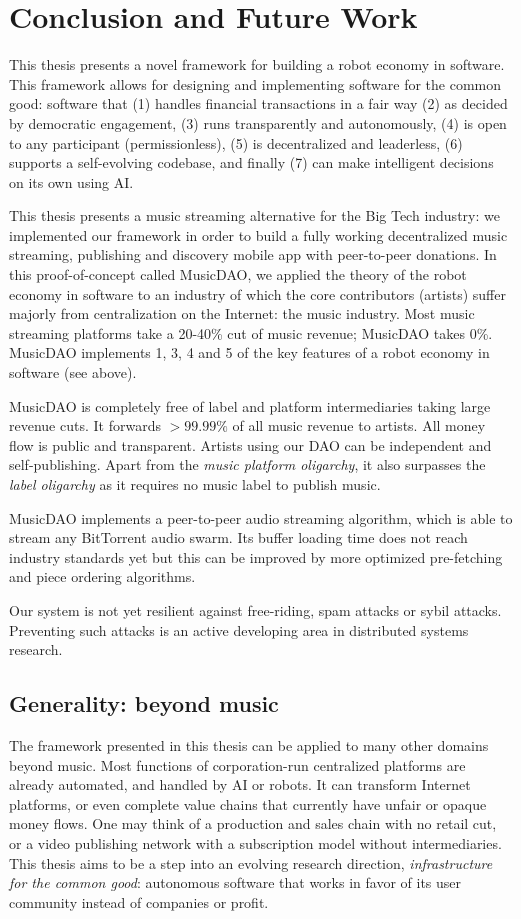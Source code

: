 \chapter{Conclusion and Future Work}
This thesis presents a novel framework for building a robot economy in software. This framework allows for designing and implementing software for the common good: software that (1) handles financial transactions in a fair way (2) as decided by democratic engagement, (3) runs transparently and autonomously, (4) is open to any participant (permissionless), (5) is decentralized and leaderless, (6) supports a self-evolving codebase, and finally (7) can make intelligent decisions on its own using AI.

This thesis presents a music streaming alternative for the Big Tech industry: we implemented our framework in order to build a fully working decentralized music streaming, publishing and discovery mobile app with peer-to-peer donations. In this proof-of-concept called MusicDAO, we applied the theory of the robot economy in software to an industry of which the core contributors (artists) suffer majorly from centralization on the Internet: the music industry. Most music streaming platforms take a 20-40\% cut of music revenue; MusicDAO takes 0\%. MusicDAO implements 1, 3, 4 and 5 of the key features of a robot economy in software (see above).

MusicDAO is completely free of label and platform intermediaries taking large revenue cuts. It forwards $>99.99\%$ of all music revenue to artists. All money flow is public and transparent. Artists using our DAO can be independent and self-publishing. Apart from the \textit{music platform oligarchy}, it also surpasses the \textit{label oligarchy} as it requires no music label to publish music.

MusicDAO implements a peer-to-peer audio streaming algorithm, which is able to stream any BitTorrent audio swarm. Its buffer loading time does not reach industry standards yet but this can be improved by more optimized pre-fetching and piece ordering algorithms. 

Our system is not yet resilient against free-riding, spam attacks or sybil attacks. Preventing such attacks is an active developing area in distributed systems research.

\section{Generality: beyond music}
The framework presented in this thesis can be applied to many other domains beyond music. Most functions of corporation-run centralized platforms are already automated, and handled by AI or robots. It can transform Internet platforms, or even complete value chains that currently have unfair or opaque money flows. One may think of a production and sales chain with no retail cut, or a video publishing network with a subscription model without intermediaries. This thesis aims to be a step into an evolving research direction, \textit{infrastructure for the common good}: autonomous software that works in favor of its user community instead of companies or profit.

